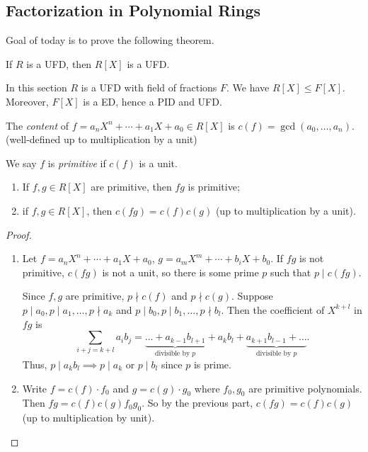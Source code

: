 \subsection{Factorization in Polynomial Rings}
Goal of today is to prove the following theorem.
\begin{theorem}
    \label{polyufd}
    If \(R\) is a UFD, then \(R[X]\) is a UFD.
\end{theorem}
In this section \(R\) is a UFD with field of fractions \(F\). We have \(R[X] \leq F[X]\). Moreover, \(F[X]\) is a ED, hence a PID and UFD.
\begin{definition}
    The \textit{content} of \(f=a_n X^n + \cdots + a_1 X + a_0 \in R[X]\) is \(c(f) = \gcd(a_0, \ldots, a_n)\). (well-defined up to multiplication by a unit)

    We say \(f\) is \textit{primitive} if \(c(f)\) is a unit.
\end{definition}
\begin{lemma}
    \label{primpoly}
    \leavevmode
    \begin{enumerate}
        \item If \(f,g \in R[X]\) are primitive, then \(fg\) is primitive;
        \item if \(f,g\in R[X]\), then \(c(fg) = c(f)c(g)\) (up to multiplication by a unit).
    \end{enumerate}
\end{lemma}
\begin{proof}
    \leavevmode
    \begin{enumerate}
        \item Let \(f = a_n X^n + \cdots + a_1 X + a_0\), \(g = a_m X^m + \cdots + b_i X + b_0\). If \(fg\) is not primitive, \(c(fg)\) is not a unit, so there is some prime \(p\) such that \(p \mid c(fg)\).
    
        Since \(f, g\) are primitive, \(p \nmid c(f)\) and \(p \nmid c(g)\). Suppose \(p \mid a_0, p \mid a_1, \ldots, p \nmid a_k\) and \(p \mid b_0, p \mid b_1, \ldots,p \nmid b_l\). Then the coefficient of \(X^{k + l}\) in \(fg\) is
        \[
            \sum_{i + j = k + l}a_{i}b_j = \underbrace{\ldots + a_{k-1}b_{l+1}}_{\text{divisible by }p} + a_{k}b_l + \underbrace{a_{k+1}b_{l-1} + \ldots}_{\text{divisible by }p}.
        \]
        Thus, \(p \mid a_k b_l \implies p \mid a_k\) or \(p \mid b_l\) since \(p\) is prime.
        \item Write \(f = c(f)\cdot f_0\) and \(g = c(g)\cdot g_0\) where \(f_0, g_0\) are primitive polynomials. Then \(fg = c(f)c(g)f_{0}g_0\). So by the previous part, \(c(fg)= c(f)c(g)\) (up to multiplication by unit).
    \end{enumerate}
\end{proof}
